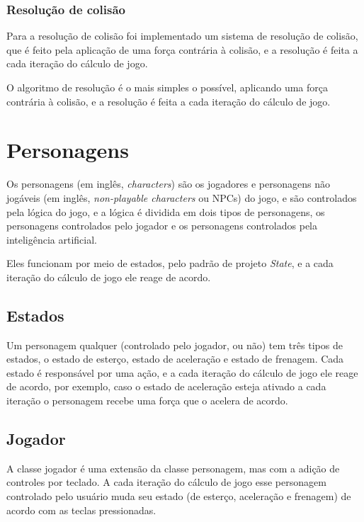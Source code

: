 \subsubsection{Resolução de colisão}

Para a resolução de colisão foi implementado um sistema de resolução de colisão, que é feito pela aplicação de uma força contrária à colisão, e a resolução é feita a cada iteração do cálculo de jogo.

O algoritmo de resolução é o mais simples o possível, aplicando uma força contrária à colisão, e a resolução é feita a cada iteração do cálculo de jogo.

\section{Personagens}

Os personagens (em inglês, \textit{characters}) são os jogadores e personagens não jogáveis (em inglês, \textit{non-playable characters} ou NPCs) do jogo, e são controlados pela lógica do jogo, e a lógica é dividida em dois tipos de personagens, os personagens controlados pelo jogador e os personagens controlados pela inteligência artificial.

Eles funcionam por meio de estados, pelo padrão de projeto \textit{State}, e a cada iteração do cálculo de jogo ele reage de acordo.

\subsection{Estados}

Um personagem qualquer (controlado pelo jogador, ou não) tem três tipos de estados, o estado de esterço, estado de aceleração e estado de frenagem. Cada estado é responsável por uma ação, e a cada iteração do cálculo de jogo ele reage de acordo, por exemplo, caso o estado de aceleração esteja ativado a cada iteração o personagem recebe uma força que o acelera de acordo.

\subsection{Jogador}

A classe jogador é uma extensão da classe personagem, mas com a adição de controles por teclado. A cada iteração do cálculo de jogo esse personagem controlado pelo usuário muda seu estado (de esterço, aceleração e frenagem) de acordo com as teclas pressionadas.

